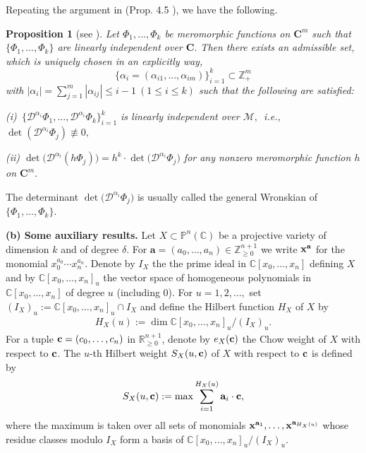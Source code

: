 \documentclass[12pt,leqno]{amsart}
\newtheorem{proposition}[equation]{Proposition}
\newcommand{\C}{{\mathbb{C}}}
\renewcommand{\P}{{\mathbb{P}}}
\newcommand{\Z}{\mathbb{Z}}
\numberwithin{equation}{section}
\begin{document}
Repeating the argument in (Prop. 4.5 \cite{Fu}), we have the following.

\begin{proposition}[{see \cite[Prop. 4.5]{Fu}}]\label{2.2}
Let $\Phi_1,...,\Phi_k$ be meromorphic functions on $\mathbf{C}^m$ such that $\{\Phi_1,...,\Phi_k\}$ 
are  linearly independent over $\mathbf{C}.$ Then  there exists an admissible set, which is uniquely chosen in an explicitly way,  
$$\{\alpha_i=(\alpha_{i1},...,\alpha_{im})\}_{i=1}^k \subset \Z^m_+$$
with $|\alpha_i|=\sum_{j=1}^{m}|\alpha_{ij}|\le i-1 \ (1\le i \le k)$ such that the following are satisfied:

(i)\  $\{{\mathcal D}^{\alpha_i}\Phi_1,...,{\mathcal D}^{\alpha_i}\Phi_k\}_{i=1}^{k}$ is linearly independent over $\mathcal M,$\ i.e., \ $\det{({\mathcal D}^{\alpha_i}\Phi_j)}\not\equiv 0,$ 

(ii) $\det \bigl({\mathcal D}^{\alpha_i}(h\Phi_j)\bigl)=h^{k}\cdot \det \bigl({\mathcal D}^{\alpha_i}\Phi_j\bigl)$ for
any nonzero meromorphic function $h$ on $\mathbf{C}^m.$
\end{proposition}
The determinant $\det \bigl({\mathcal D}^{\alpha_i}\Phi_j\bigl)$ is usually called the general Wronskian of $\{\Phi_1,...,\Phi_k\}$.

\vskip0.2cm
\noindent
\textbf{(b) Some auxiliary results.}  Let $X\subset\P^n(\C)$ be a projective variety of dimension $k$ and of degree $\delta$. For $\textbf{a} = (a_0,\ldots,a_n)\in\mathbb Z^{n+1}_{\ge 0}$ we write ${\bf x}^{\bf a}$ for the monomial $x^{a_0}_0\cdots x^{a_n}_n$. Denote by $I_X$ the the prime ideal in $\C[x_0,\ldots,x_n]$ defining $X$ and by $\C[x_0,\ldots,x_n]_u$ the vector space of homogeneous polynomials in $\C[x_0,\ldots,x_n]$ of degree $u$ (including $0$). For $u= 1, 2,\ldots,$ set $(I_X)_u:=\C[x_0,\ldots,x_n]_u\cap I_X$ and define the Hilbert function $H_X$ of $X$ by
\begin{align*}
H_X(u):=\dim\C[x_0,\ldots,x_n]_u/(I_X)_u.
\end{align*}
For a tuple ${\bf c}=(c_0,\ldots,c_n)$ in $\mathbb R^{n+1}_{\ge 0}$, denote by $e_X({\bf c})$ the Chow weight of $X$ with respect to ${\bf c}$. The $u$-th Hilbert weight $S_X(u,{\bf c})$ of $X$ with respect to ${\bf c}$ is defined by
\begin{align*}
S_X(u,{\bf c}):=\max\sum_{i=1}^{H_X(u)}{\bf a}_i\cdot{\bf c},
\end{align*}
where the maximum is taken over all sets of monomials ${\bf x}^{{\bf a}_1},\ldots,{\bf x}^{{\bf a}_{H_X(u)}}$ whose residue classes modulo $I_X$ form a basis of $\C[x_0,\ldots,x_n]_u/(I_X)_u.$
\end{document}
